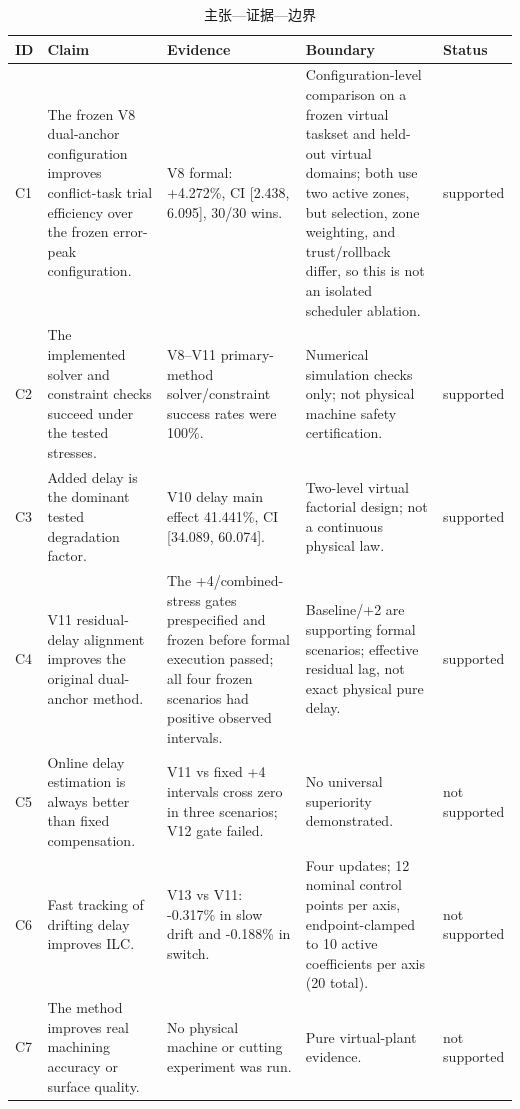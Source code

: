 \begin{table}[t]
\centering
\small
\setlength{\tabcolsep}{3pt}
\caption{主张—证据—边界}
\label{tab:table3_claim_evidence_boundary}
\begin{tabularx}{\textwidth}{>{\raggedright\arraybackslash}X>{\raggedright\arraybackslash}X>{\raggedright\arraybackslash}X>{\raggedright\arraybackslash}X>{\raggedright\arraybackslash}X}
\toprule
ID & Claim & Evidence & Boundary & Status \\
\midrule
C1 & The frozen V8 dual-anchor configuration improves conflict-task trial efficiency over the frozen error-peak configuration. & V8 formal: +4.272\%, CI [2.438, 6.095], 30/30 wins. & Configuration-level comparison on a frozen virtual taskset and held-out virtual domains; both use two active zones, but selection, zone weighting, and trust/rollback differ, so this is not an isolated scheduler ablation. & supported \\
C2 & The implemented solver and constraint checks succeed under the tested stresses. & V8–V11 primary-method solver/constraint success rates were 100\%. & Numerical simulation checks only; not physical machine safety certification. & supported \\
C3 & Added delay is the dominant tested degradation factor. & V10 delay main effect 41.441\%, CI [34.089, 60.074]. & Two-level virtual factorial design; not a continuous physical law. & supported \\
C4 & V11 residual-delay alignment improves the original dual-anchor method. & The +4/combined-stress gates prespecified and frozen before formal execution passed; all four frozen scenarios had positive observed intervals. & Baseline/+2 are supporting formal scenarios; effective residual lag, not exact physical pure delay. & supported \\
C5 & Online delay estimation is always better than fixed compensation. & V11 vs fixed +4 intervals cross zero in three scenarios; V12 gate failed. & No universal superiority demonstrated. & not supported \\
C6 & Fast tracking of drifting delay improves ILC. & V13 vs V11: -0.317\% in slow drift and -0.188\% in switch. & Four updates; 12 nominal control points per axis, endpoint-clamped to 10 active coefficients per axis (20 total). & not supported \\
C7 & The method improves real machining accuracy or surface quality. & No physical machine or cutting experiment was run. & Pure virtual-plant evidence. & not supported \\
\bottomrule
\end{tabularx}
\end{table}
